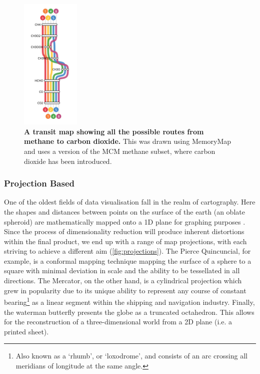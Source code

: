 \begin{figure}[H]
     \centering
     \includegraphics[width=0.25\textwidth, angle=0]{figures_c1/layout/memory.png}
         \caption{\textbf{A transit map showing all the possible routes from methane to carbon dioxide.} This was drawn using MemoryMap \citep{memory} and uses a version of the MCM methane subset, where carbon dioxide has been introduced.}
        \label{fig:mem}
\end{figure}





\subsubsection{Projection Based}\label{sec:merc}
One of the oldest fields of data visualisation fall in the realm of cartography. Here the shapes and distances between points on the surface of the earth (an oblate spheroid) are mathematically mapped onto a 1D plane for graphing purposes \citep{projections}. Since the process of dimensionality reduction will produce inherent distortions within the final product, we end up with a range of map projections, with each striving to achieve a different aim (\autoref{fig:projections}). The Pierce Quincuncial, for example, is a conformal mapping technique mapping the surface of a sphere to a square with minimal deviation in scale and the ability to be tessellated in all directions. The Mercator, on the other hand, is a cylindrical projection which grew in popularity due to its unique ability to represent any course of constant bearing\footnote{Also known as a `rhumb', or `loxodrome', and consists of an arc crossing all meridians of longitude at the same angle.} as a linear segment within the shipping and navigation industry.  Finally, the waterman butterfly presents the globe as a truncated octahedron. This allows for the reconstruction of a three-dimensional world from a 2D plane (i.e. a printed sheet).


